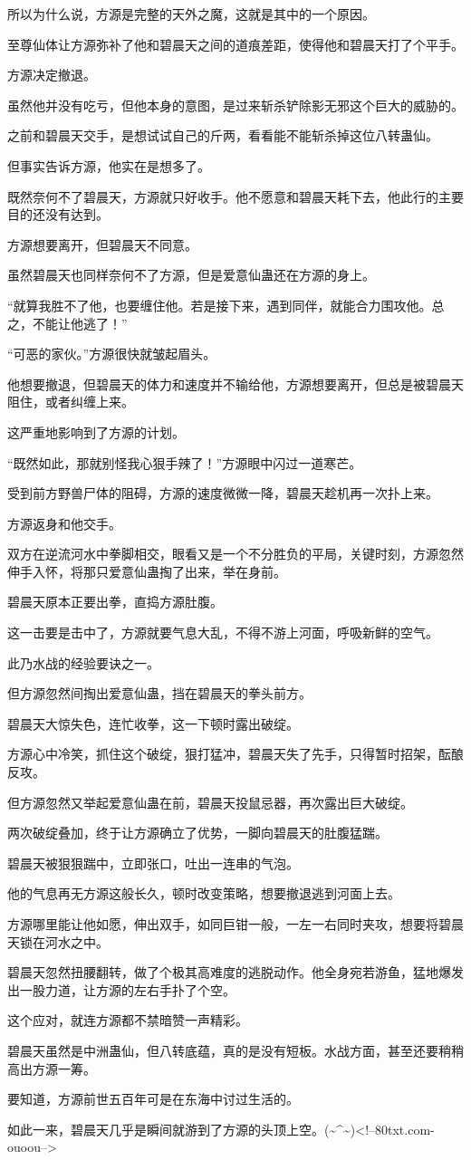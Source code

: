 \begin{this_body}
所以为什么说，方源是完整的天外之魔，这就是其中的一个原因。

至尊仙体让方源弥补了他和碧晨天之间的道痕差距，使得他和碧晨天打了个平手。

方源决定撤退。

虽然他并没有吃亏，但他本身的意图，是过来斩杀铲除影无邪这个巨大的威胁的。

之前和碧晨天交手，是想试试自己的斤两，看看能不能斩杀掉这位八转蛊仙。

但事实告诉方源，他实在是想多了。

既然奈何不了碧晨天，方源就只好收手。他不愿意和碧晨天耗下去，他此行的主要目的还没有达到。

方源想要离开，但碧晨天不同意。

虽然碧晨天也同样奈何不了方源，但是爱意仙蛊还在方源的身上。

“就算我胜不了他，也要缠住他。若是接下来，遇到同伴，就能合力围攻他。总之，不能让他逃了！”

“可恶的家伙。”方源很快就皱起眉头。

他想要撤退，但碧晨天的体力和速度并不输给他，方源想要离开，但总是被碧晨天阻住，或者纠缠上来。

这严重地影响到了方源的计划。

“既然如此，那就别怪我心狠手辣了！”方源眼中闪过一道寒芒。

受到前方野兽尸体的阻碍，方源的速度微微一降，碧晨天趁机再一次扑上来。

方源返身和他交手。

双方在逆流河水中拳脚相交，眼看又是一个不分胜负的平局，关键时刻，方源忽然伸手入怀，将那只爱意仙蛊掏了出来，举在身前。

碧晨天原本正要出拳，直捣方源肚腹。

这一击要是击中了，方源就要气息大乱，不得不游上河面，呼吸新鲜的空气。

此乃水战的经验要诀之一。

但方源忽然间掏出爱意仙蛊，挡在碧晨天的拳头前方。

碧晨天大惊失色，连忙收拳，这一下顿时露出破绽。

方源心中冷笑，抓住这个破绽，狠打猛冲，碧晨天失了先手，只得暂时招架，酝酿反攻。

但方源忽然又举起爱意仙蛊在前，碧晨天投鼠忌器，再次露出巨大破绽。

两次破绽叠加，终于让方源确立了优势，一脚向碧晨天的肚腹猛踹。

碧晨天被狠狠踹中，立即张口，吐出一连串的气泡。

他的气息再无方源这般长久，顿时改变策略，想要撤退逃到河面上去。

方源哪里能让他如愿，伸出双手，如同巨钳一般，一左一右同时夹攻，想要将碧晨天锁在河水之中。

碧晨天忽然扭腰翻转，做了个极其高难度的逃脱动作。他全身宛若游鱼，猛地爆发出一股力道，让方源的左右手扑了个空。

这个应对，就连方源都不禁暗赞一声精彩。

碧晨天虽然是中洲蛊仙，但八转底蕴，真的是没有短板。水战方面，甚至还要稍稍高出方源一筹。

要知道，方源前世五百年可是在东海中讨过生活的。

如此一来，碧晨天几乎是瞬间就游到了方源的头顶上空。(\~{}\^{}\~{})<!--80txt.com-ouoou-->

\end{this_body}

